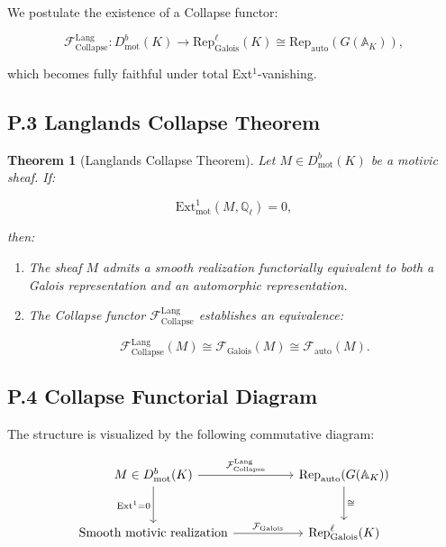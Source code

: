 \documentclass[11pt]{article}
\newtheorem{theorem}{Theorem}[section]
\begin{document}
We postulate the existence of a Collapse functor:

\[
\mathcal{F}_{\mathrm{Collapse}}^{\mathrm{Lang}} : D^b_{\mathrm{mot}}(K) \longrightarrow \mathrm{Rep}^\ell_{\mathrm{Galois}}(K) \cong \mathrm{Rep}_{\mathrm{auto}}(G(\mathbb{A}_K)),
\]

which becomes fully faithful under total Ext$^1$-vanishing.

\subsection*{P.3 Langlands Collapse Theorem}

\begin{theorem}[Langlands Collapse Theorem]
Let $M \in D^b_{\mathrm{mot}}(K)$ be a motivic sheaf. If:

\[
\mathrm{Ext}^1_{\mathrm{mot}}(M, \mathbb{Q}_\ell) = 0,
\]

then:
\begin{enumerate}
  \item The sheaf $M$ admits a smooth realization functorially equivalent to both a Galois representation and an automorphic representation.
  \item The Collapse functor $\mathcal{F}_{\mathrm{Collapse}}^{\mathrm{Lang}}$ establishes an equivalence:

  \[
  \mathcal{F}_{\mathrm{Collapse}}^{\mathrm{Lang}}(M) \cong \mathcal{F}_{\mathrm{Galois}}(M) \cong \mathcal{F}_{\mathrm{auto}}(M).
  \]
\end{enumerate}

\end{theorem}

\subsection*{P.4 Collapse Functorial Diagram}

The structure is visualized by the following commutative diagram:

\[
\begin{tikzcd}[column sep=huge, row sep=large]
M \in D^b_{\mathrm{mot}}(K) \arrow[r, "\mathcal{F}_{\mathrm{Collapse}}^{\mathrm{Lang}}"] \arrow[d, swap, "\mathrm{Ext}^1 = 0"]
& \mathrm{Rep}_{\mathrm{auto}}(G(\mathbb{A}_K)) \arrow[d, "\cong"] \\
\text{Smooth motivic realization} \arrow[r, "\mathcal{F}_{\mathrm{Galois}}"]
& \mathrm{Rep}^\ell_{\mathrm{Galois}}(K)
\end{tikzcd}
\]
\end{document}
